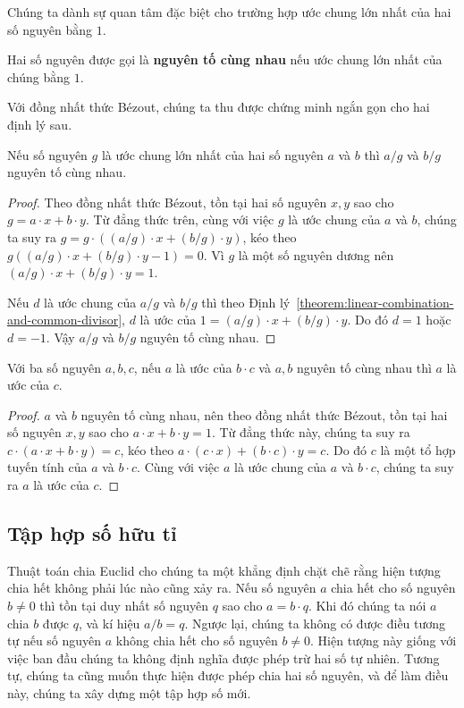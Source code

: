 Chúng ta dành sự quan tâm đặc biệt cho trường hợp ước chung lớn nhất của hai số nguyên bằng $1$.
\begin{definition}
	Hai số nguyên được gọi là \textbf{nguyên tố cùng nhau} nếu ước chung lớn nhất của chúng bằng $1$.
\end{definition}

Với đồng nhất thức B\'{e}zout, chúng ta thu được chứng minh ngắn gọn cho hai định lý sau.
\begin{theorem}
	Nếu số nguyên $g$ là ước chung lớn nhất của hai số nguyên $a$ và $b$ thì $a/g$ và $b/g$ nguyên tố cùng nhau.
\end{theorem}

\begin{proof}
	Theo đồng nhất thức B\'{e}zout, tồn tại hai số nguyên $x, y$ sao cho $g = a\cdot x + b\cdot y$. Từ đẳng thức trên, cùng với việc $g$ là ước chung của $a$ và $b$, chúng ta suy ra $g = g\cdot ((a/g)\cdot x + (b/g)\cdot y)$, kéo theo $g((a/g)\cdot x + (b/g)\cdot y - 1) = 0$. Vì $g$ là một số nguyên dương nên $(a/g)\cdot x + (b/g)\cdot y = 1$.

	Nếu $d$ là ước chung của $a/g$ và $b/g$ thì theo Định lý~\ref{theorem:linear-combination-and-common-divisor}, $d$ là ước của $1 = (a/g)\cdot x + (b/g)\cdot y$. Do đó $d = 1$ hoặc $d = -1$. Vậy $a/g$ và $b/g$ nguyên tố cùng nhau.
\end{proof}

\begin{theorem}[Bổ đề Euclid]
	Với ba số nguyên $a, b, c$, nếu $a$ là ước của $b\cdot c$ và $a, b$ nguyên tố cùng nhau thì $a$ là ước của $c$.
\end{theorem}

\begin{proof}
	$a$ và $b$ nguyên tố cùng nhau, nên theo đồng nhất thức B\'{e}zout, tồn tại hai số nguyên $x, y$ sao cho $a\cdot x + b\cdot y = 1$. Từ đẳng thức này, chúng ta suy ra $c\cdot (a\cdot x + b\cdot y) = c$, kéo theo $a\cdot (c\cdot x) + (b\cdot c)\cdot y = c$. Do đó $c$ là một tổ hợp tuyến tính của $a$ và $b\cdot c$. Cùng với việc $a$ là ước chung của $a$ và $b\cdot c$, chúng ta suy ra $a$ là ước của $c$.
\end{proof}

\subsection*{Tập hợp số hữu tỉ}

Thuật toán chia Euclid cho chúng ta một khẳng định chặt chẽ rằng hiện tượng chia hết không phải lúc nào cũng xảy ra. Nếu số nguyên $a$ chia hết cho số nguyên $b\ne 0$ thì tồn tại duy nhất số nguyên $q$ sao cho $a = b\cdot q$. Khi đó chúng ta nói $a$ chia $b$ được $q$, và kí hiệu $a/b = q$. Ngược lại, chúng ta không có được điều tương tự nếu số nguyên $a$ không chia hết cho số nguyên $b\ne 0$. Hiện tượng này giống với việc ban đầu chúng ta không định nghĩa được phép trừ hai số tự nhiên. Tương tự, chúng ta cũng muốn thực hiện được phép chia hai số nguyên, và để làm điều này, chúng ta xây dựng một tập hợp số mới.

